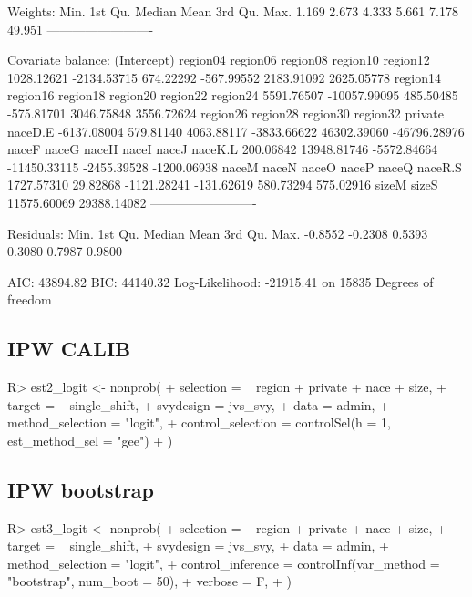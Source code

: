 \documentclass[
]{jss}
\begin{document}
\begin{CodeChunk}
\begin{CodeOutput}
Weights:
   Min. 1st Qu.  Median    Mean 3rd Qu.    Max. 
  1.169   2.673   4.333   5.661   7.178  49.951 
-------------------------

Covariate balance:
 (Intercept)     region04     region06     region08     region10     region12 
  1028.12621  -2134.53715    674.22292   -567.99552   2183.91092   2625.05778 
    region14     region16     region18     region20     region22     region24 
  5591.76507 -10057.99095    485.50485   -575.81701   3046.75848   3556.72624 
    region26     region28     region30     region32      private      naceD.E 
 -6137.08004    579.81140   4063.88117  -3833.66622  46302.39060 -46796.28976 
       naceF        naceG        naceH        naceI        naceJ      naceK.L 
   200.06842  13948.81746  -5572.84664 -11450.33115  -2455.39528  -1200.06938 
       naceM        naceN        naceO        naceP        naceQ      naceR.S 
  1727.57310     29.82868  -1121.28241   -131.62619    580.73294    575.02916 
       sizeM        sizeS 
 11575.60069  29388.14082 
-------------------------

Residuals:
   Min. 1st Qu.  Median    Mean 3rd Qu.    Max. 
-0.8552 -0.2308  0.5393  0.3080  0.7987  0.9800 

AIC: 43894.82
BIC: 44140.32
Log-Likelihood: -21915.41 on 15835 Degrees of freedom
\end{CodeOutput}
\end{CodeChunk}

\hypertarget{ipw-calib}{%
\subsection{IPW CALIB}\label{ipw-calib}}

\begin{CodeChunk}
\begin{CodeInput}
R> est2_logit <- nonprob(
+   selection = ~ region + private + nace + size,
+   target = ~ single_shift,
+   svydesign = jvs_svy,
+   data = admin,
+   method_selection = "logit",
+   control_selection = controlSel(h = 1, est_method_sel = "gee")
+ )
\end{CodeInput}
\end{CodeChunk}

\hypertarget{ipw-bootstrap}{%
\subsection{IPW bootstrap}\label{ipw-bootstrap}}

\begin{CodeChunk}
\begin{CodeInput}
R> est3_logit <- nonprob(
+   selection = ~ region + private + nace + size,
+   target = ~ single_shift,
+   svydesign = jvs_svy,
+   data = admin,
+   method_selection = "logit",
+   control_inference = controlInf(var_method = "bootstrap", num_boot = 50),
+   verbose = F,
+ )
\end{CodeInput}
\end{CodeChunk}
\end{document}
